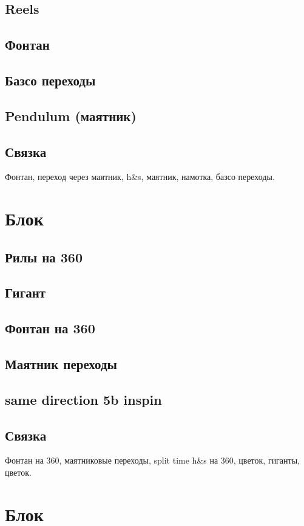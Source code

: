 \documentclass[a4paper, 12pt]{article}
\begin{document}
	\subsection{Reels}
	\subsection{Фонтан}
	\subsection{Базсо переходы}
	\subsection{Pendulum (маятник)}
	\subsection{Связка}
	
	Фонтан, переход через маятник, h\&s, маятник, намотка, базсо переходы.
	
	\section{Блок}
	
	\subsection{Рилы на 360}
	\subsection{Гигант}
	\subsection{Фонтан на 360}
	\subsection{Маятник переходы}
	\subsection{same direction 5b inspin}
	\subsection{Связка}
		Фонтан на 360, маятниковые переходы, split time h\&s на 360, цветок, гиганты, цветок.
		
	\section{Блок}
	
\end{document}

